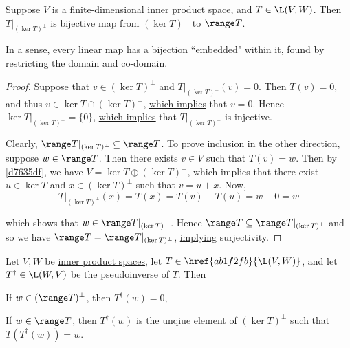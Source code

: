 \label{eab487c}

Suppose $V$ is a finite-dimensional \href{b9935c8}{inner product space}, and
$T\in\L(V,W)$. Then $T|_{(\ker T)^\perp}$ is \href{d205f32}{bijective} map from
$(\ker T)^\perp$ to $\range T$.

In a sense, every linear map has a bijection ``embedded" within it, found by
restricting the domain and co-domain.

\begin{proof}
  \def\T{T|_{(\ker T)^\perp}}

  Suppose that $v\in(\ker T)^\perp$ and $\T(v)=0$. \href{efec72b}{Then}
  $T(v)=0$, and thus $v\in\ker T\cap(\ker T)^\perp$, \href{fb661b9}{which
  implies} that $v=0$. Hence $\ker\T=\{0\}$, \href{f68db52}{which implies} that
  $\T$ is injective.

  Clearly, $\range\T\subseteq\range T$. To prove inclusion in the other
  direction, suppose $w\in\range T$. Then there exists $v\in V$ such that
  $T(v)=w$. Then by \autoref{d7635df}, we have $V=\ker T\oplus(\ker T)^\perp$,
  which implies that there exist $u\in\ker T$ and $x\in(\ker T)^\perp$ such
  that $v=u+x$. Now,
  $$
    \T(x)=T(x)=T(v)-T(u)=w-0=w
  $$

  which shows that $w\in\range\T$. Hence $\range T\subseteq\range\T$ and so we
  have $\range T=\range\T$, \href{a41ddec}{implying} surjectivity.
\end{proof}

\label{b88d2b0}

Let $V,W$ be \href{b9935c8}{inner product spaces}, let
$T\in\href{ab1f2fb}{\L(V,W)}$, and let $T^\dagger\in\L(W,V)$ be the
\href{ba879e1}{pseudoinverse} of $T$. Then
\begin{enumerata}
  \item If $w\in(\range T)^\perp$, then $T^\dagger(w)=0$,
  \item If $w\in\range T$, then $T^\dagger(w)$ is the unqiue element of $(\ker
        T)^\perp$ such that $T(T^\dagger(w))=w$.
\end{enumerata}


